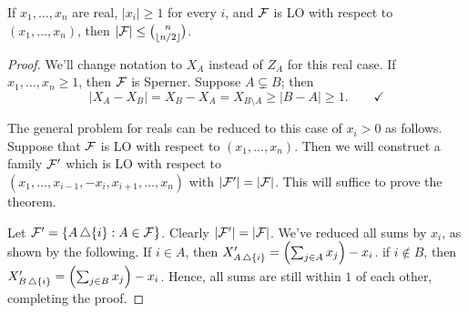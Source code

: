 \begin{theorem}
If $x_1,\dotsc,x_n$ are real, $|x_i| \geq 1$ for every $i$, and $\mathcal{F}$ is LO with respect to $(x_1,\dotsc,x_n)$, then $|\mathcal{F}| \leq { n\choose \lfloor n/2\rfloor}$.
\end{theorem}
\begin{proof}	
We'll change notation to $X_A$ instead of $Z_A$ for this real case. If $x_1,\dotsc,x_n \geq 1$, then $\mathcal{F}$ is Sperner. Suppose $A\subsetneq B$; then
\[
|X_A - X_B| = X_B - X_A = X_{B\setminus A} \geq |B-A| \geq 1. \qquad \checkmark
\]

The general problem for reals can be reduced to this case of $x_i>0$ as follows.
Suppose that $\mathcal{F}$ is LO with respect to $(x_1,\dotsc,x_n)$. Then we will construct a family $\mathcal{F}'$ which is LO with respect to \\$(x_1,\dotsc, x_{i-1},-x_i, x_{i+1}, \dotsc, x_n)$ with $|\mathcal{F}'| = |\mathcal{F}|$. This will suffice to prove the theorem.

Let $\mathcal{F}' = \{ A \operatorname{\triangle} \{i\}: A\in \mathcal{F}\}$. Clearly $|\mathcal{F}'| = |\mathcal{F}|$. We've reduced all sums by $x_i$, as shown by the following. If $i \in A$, then $X'_{A \operatorname{\triangle} \{i\}} = \left(\sum_{j\in A} x_j \right)-x_i$. if $i \not \in B$, then $X'_{B \operatorname{\triangle} \{i\}} = \left( \sum_{j\in B} x_j \right) - x_i$.
Hence, all sums are still within $1$ of each other, completing the proof.
\end{proof}



